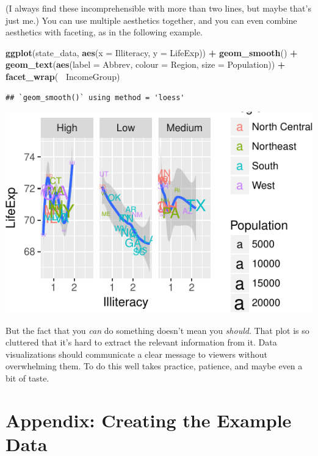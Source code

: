 \documentclass[12pt,oneside,openany]{book}
\newenvironment{Shaded}{\begin{snugshade}}{\end{snugshade}}
\newcommand{\KeywordTok}[1]{\textcolor[rgb]{0.13,0.29,0.53}{\textbf{#1}}}
\newcommand{\DataTypeTok}[1]{\textcolor[rgb]{0.13,0.29,0.53}{#1}}
\newcommand{\StringTok}[1]{\textcolor[rgb]{0.31,0.60,0.02}{#1}}
\newcommand{\OperatorTok}[1]{\textcolor[rgb]{0.81,0.36,0.00}{\textbf{#1}}}
\newcommand{\NormalTok}[1]{#1}
\begin{document}
(I always find these incomprehensible with more than two lines, but
maybe that's just me.) You can use multiple aesthetics together, and you
can even combine aesthetics with faceting, as in the following example.

\begin{Shaded}
\begin{Highlighting}[]
\KeywordTok{ggplot}\NormalTok{(state_data, }\KeywordTok{aes}\NormalTok{(}\DataTypeTok{x =}\NormalTok{ Illiteracy, }\DataTypeTok{y =}\NormalTok{ LifeExp)) }\OperatorTok{+}
\StringTok{  }\KeywordTok{geom_smooth}\NormalTok{() }\OperatorTok{+}
\StringTok{  }\KeywordTok{geom_text}\NormalTok{(}\KeywordTok{aes}\NormalTok{(}\DataTypeTok{label =}\NormalTok{ Abbrev, }\DataTypeTok{colour =}\NormalTok{ Region, }\DataTypeTok{size =}\NormalTok{ Population)) }\OperatorTok{+}
\StringTok{  }\KeywordTok{facet_wrap}\NormalTok{(}\OperatorTok{~}\StringTok{ }\NormalTok{IncomeGroup)}
\end{Highlighting}
\end{Shaded}

\begin{verbatim}
## `geom_smooth()` using method = 'loess'
\end{verbatim}

\includegraphics{pdaps_files/figure-latex/too-many-things-1.pdf}

But the fact that you \emph{can} do something doesn't mean you
\emph{should}. That plot is so cluttered that it's hard to extract the
relevant information from it. Data visualizations should communicate a
clear message to viewers without overwhelming them. To do this well
takes practice, patience, and maybe even a bit of taste.

\section{Appendix: Creating the Example
Data}\label{appendix-creating-the-example-data-1}
\end{document}
